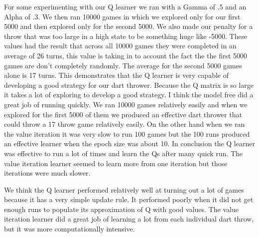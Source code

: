 \documentclass[solution, letterpaper]{cs121}
\begin{document}
For some experimenting with our Q learner we ran with a Gamma of .5 and an Alpha of .3. We then ran 10000 games in which we explored only for our first 5000 and then explored only for the second 5000. We also made our penalty for a throw that was too large in a high state to be something huge like -5000. These values had the result that across all 10000 games they were completed in an average of 26 turns, this value is taking in to account the fact the the first 5000 games are don't completely randomly. The average for the second 5000 games alone is 17 turns. This demonstrates that the Q learner is very capable of developing a good strategy for our dart thrower. Because the Q matrix is so large it takes a lot of exploring to develop a good strategy. 
\subproblem{} %
I think the model free did a great job of running quickly. We ran 10000 games relatively easily and when we explored for the first 5000 of them we produced an effective dart thrower that could throw a 17 throw game relatively easily. 
On the other hand when we ran the value iteration it was very slow to run 100 games but the 100 runs produced an effective learner when the epoch size was about 10.  
In conclusion the Q learner was effective to run a lot of times and learn the Qs after many quick run. The value iteration learner seemed to learn more from one iteration but those iterations were much slower.

We think the Q learner performed relatively well at turning out a lot of games because it has a very simple update rule. It performed poorly when it did not get enough runs to populate its approximation of Q with good values.
The value iteration learner did a great job of learning a lot from each individual dart throw, but it was more computationally intensive. 
\end{document}
